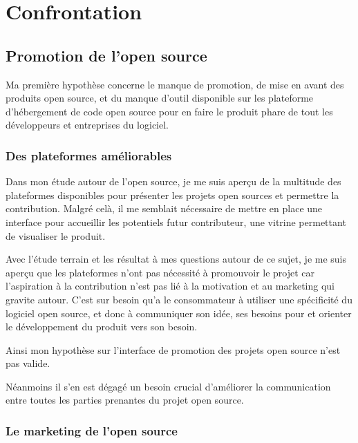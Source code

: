 \chapter{Confrontation} %


\section{Promotion de l'open source}

	Ma première hypothèse concerne le manque de promotion, de mise en avant des produits open source, et du manque d'outil disponible sur les plateforme d'hébergement de code open source pour en faire le produit phare de tout les développeurs et entreprises du logiciel.

	\subsection{Des plateformes améliorables}

	Dans mon étude autour de l'open source, je me suis aperçu de la multitude des plateformes disponibles pour présenter les projets open sources et permettre la contribution. Malgré celà, il me semblait nécessaire de mettre en place une interface pour accueillir les potentiels futur contributeur, une vitrine permettant de visualiser le produit.

	Avec l'étude terrain et les résultat à mes questions autour de ce sujet, je me suis aperçu que les plateformes n'ont pas nécessité à promouvoir le projet car l'aspiration à la contribution n'est pas lié à la motivation et au marketing qui gravite autour. C'est sur besoin qu'a le consommateur à utiliser une spécificité du logiciel open source, et donc à communiquer son idée, ses besoins pour  et orienter le développement du produit vers son besoin.

	Ainsi mon hypothèse sur l'interface de promotion des projets open source n'est pas valide.

	Néanmoins il s'en est dégagé un besoin crucial d'améliorer la communication entre toutes les parties prenantes du projet open source.

	\subsection{Le marketing de l'open source}



